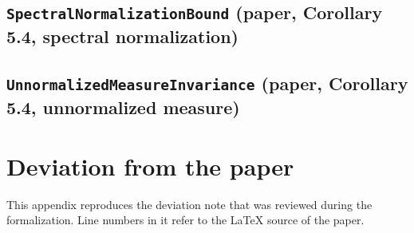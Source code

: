 \documentclass[11pt]{amsart}
\theoremstyle{definition}
\begin{document}
\subsection{\texorpdfstring{\texttt{SpectralNormalizationBound} (paper, Corollary 5.4, spectral normalization)}{SpectralNormalizationBound}}\label{node:SpectralNormalizationBound}


\subsection{\texorpdfstring{\texttt{UnnormalizedMeasureInvariance} (paper, Corollary 5.4, unnormalized measure)}{UnnormalizedMeasureInvariance}}\label{node:UnnormalizedMeasureInvariance}


\appendix
\section{Deviation from the paper}\label{sec:deviation}
This appendix reproduces the deviation note that was reviewed during the formalization. Line numbers in it refer to the \LaTeX{} source of the paper.
\begingroup\renewcommand{\section}[2]{}\endgroup
\end{document}
